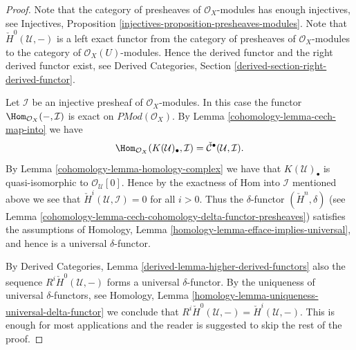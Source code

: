 \begin{proof}

Note that the category of presheaves of $\mathcal{O}_X$-modules
has enough injectives, see
Injectives, Proposition \ref{injectives-proposition-presheaves-modules}.
Note that $\check{H}^0(\mathcal{U}, -)$ is a left exact functor
from the category of presheaves of $\mathcal{O}_X$-modules
to the category of $\mathcal{O}_X(U)$-modules.
Hence the derived functor and the right derived functor exist, see
Derived Categories, Section \ref{derived-section-right-derived-functor}.

\medskip\noindent
Let $\mathcal{I}$ be an injective presheaf of $\mathcal{O}_X$-modules.
In this case the functor $\Hom_{\mathcal{O}_X}(-, \mathcal{I})$
is exact on $\textit{PMod}(\mathcal{O}_X)$. By
Lemma \ref{cohomology-lemma-cech-map-into} we have
$$
\Hom_{\mathcal{O}_X}(K(\mathcal{U})_\bullet, \mathcal{I})
=
\check{\mathcal{C}}^\bullet(\mathcal{U}, \mathcal{I}).
$$
By Lemma \ref{cohomology-lemma-homology-complex} we have that $K(\mathcal{U})_\bullet$ is
quasi-isomorphic to $\mathcal{O}_\mathcal{U}[0]$. Hence by
the exactness of Hom into $\mathcal{I}$ mentioned above we see
that $\check{H}^i(\mathcal{U}, \mathcal{I}) = 0$ for all
$i > 0$. Thus the $\delta$-functor $(\check{H}^n, \delta)$
(see Lemma \ref{cohomology-lemma-cech-cohomology-delta-functor-presheaves})
satisfies the assumptions of
Homology, Lemma \ref{homology-lemma-efface-implies-universal},
and hence is a universal $\delta$-functor.

\medskip\noindent
By
Derived Categories, Lemma \ref{derived-lemma-higher-derived-functors}
also the sequence $R^i\check{H}^0(\mathcal{U}, -)$
forms a universal $\delta$-functor. By the uniqueness of universal
$\delta$-functors, see
Homology, Lemma \ref{homology-lemma-uniqueness-universal-delta-functor}
we conclude that
$R^i\check{H}^0(\mathcal{U}, -) = \check{H}^i(\mathcal{U}, -)$.
This is enough for most applications
and the reader is suggested to skip the rest of the proof.


\end{proof}
